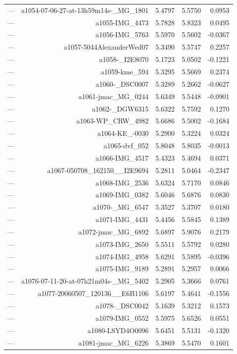 \begin{table}[htbp]
\begin{tabular}{lrrrr}
— & a1054-07-06-27-at-13h59m14s-_MG_1801 & 5.4797 & 5.5750 & 0.0953 \\
— & a1055-IMG_4473 & 5.7828 & 5.8323 & 0.0495 \\
— & a1056-IMG_5763 & 5.5970 & 5.5602 & -0.0367 \\
— & a1057-5044AlexanderWed07 & 5.3490 & 5.5747 & 0.2257 \\
— & a1058-_I2E8070 & 5.1723 & 5.0502 & -0.1221 \\
— & a1059-kme_594 & 5.3295 & 5.5669 & 0.2374 \\
— & a1060-_DSC0007 & 5.3289 & 5.2662 & -0.0627 \\
— & a1061-jmac_MG_0244 & 5.6349 & 5.5448 & -0.0901 \\
— & a1062-_DGW6315 & 5.6322 & 5.7592 & 0.1270 \\
— & a1063-WP_CRW_4982 & 5.6686 & 5.5002 & -0.1684 \\
— & a1064-KE_-0030 & 5.2900 & 5.3224 & 0.0324 \\
— & a1065-dvf_052 & 5.8048 & 5.8035 & -0.0013 \\
— & a1066-IMG_4517 & 5.4323 & 5.4694 & 0.0371 \\
— & a1067-050708_162150__I2E9694 & 5.2811 & 5.0464 & -0.2347 \\
— & a1068-IMG_2536 & 5.6324 & 5.7170 & 0.0846 \\
— & a1069-IMG_0382 & 5.6046 & 5.6876 & 0.0830 \\
— & a1070-_MG_6547 & 5.3527 & 5.3707 & 0.0180 \\
— & a1071-IMG_4431 & 5.4456 & 5.5845 & 0.1389 \\
— & a1072-jmac_MG_6892 & 5.6897 & 5.9076 & 0.2179 \\
— & a1073-IMG_2650 & 5.5511 & 5.5792 & 0.0280 \\
— & a1074-IMG_4958 & 5.6291 & 5.5895 & -0.0396 \\
— & a1075-IMG_9189 & 5.2891 & 5.2957 & 0.0066 \\
— & a1076-07-11-20-at-07h21m04s-_MG_5402 & 5.2905 & 5.3666 & 0.0761 \\
— & a1077-20060507_120136__E6B1106 & 5.6197 & 5.4641 & -0.1556 \\
— & a1078-_DSC0042 & 5.1639 & 5.3212 & 0.1573 \\
— & a1079-IMG_0552 & 5.5975 & 5.6526 & 0.0551 \\
— & a1080-LSYD4O0096 & 5.6451 & 5.5131 & -0.1320 \\
— & a1081-jmac_MG_6226 & 5.3869 & 5.5470 & 0.1601 \\

\end{tabular}
\end{table}
